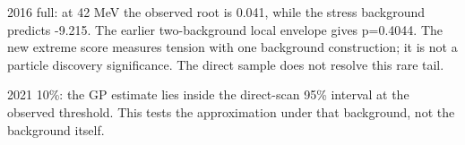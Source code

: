 2016 full: at 42 MeV the observed root is 0.041, while the stress background predicts -9.215. The earlier two-background local envelope gives p=0.4044. The new extreme score measures tension with one background construction; it is not a particle discovery significance. The direct sample does not resolve this rare tail.

2021 10\%: the GP estimate lies inside the direct-scan 95\% interval at the observed threshold. This tests the approximation under that background, not the background itself.
